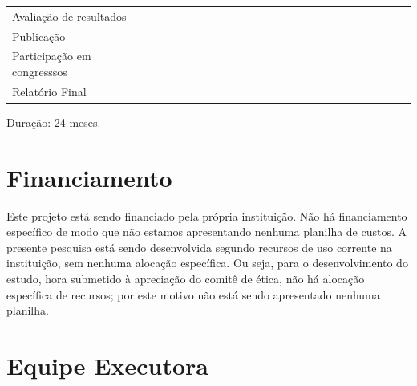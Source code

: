 \documentclass[rascunho,xindy]{Classe-Latex-FEI/fei}
\begin{document}
\begin{landscape}
\begin{table}[ht]
\begin{center}
\begin{tabular}{|l |l |l |l |l ||l |l |l |l ||l |l |l |l ||l |l |l |l ||l |l |l |l ||l |l |l |l ||}
      Avaliação de resultados           &   &   &   &   & \cellcolor{black!80} & \cellcolor{black!80} & \cellcolor{black!80} & \cellcolor{black!80} & \cellcolor{black!80} &   &   &   &   &   &   &   &   &   &   &   &   &   &   &   \\ 
      Publicação                        &   &   &   &   &   & \cellcolor{black!80} & \cellcolor{black!80} & \cellcolor{black!80} & \cellcolor{black!80} &   &   &   &   &   &   &   &   &   &   &   &   &   &   &   \\
      Participação em congresssos       &   &   &   &   &   &   &   &   & \cellcolor{black!80} & \cellcolor{black!80} &   &   &   &   &   &   &   &   &   &   &   &   &   &   \\
      \hline
      Relatório Final                   &   & \cellcolor{black!80} & \cellcolor{black!80} & \cellcolor{black!80} & \cellcolor{black!80} & \cellcolor{black!80} & \cellcolor{black!80} & \cellcolor{black!80} & \cellcolor{black!80} & \cellcolor{black!80} & \cellcolor{black!80} & \cellcolor{black!80} & \cellcolor{black!80} & \cellcolor{black!80} & \cellcolor{black!80} & \cellcolor{black!80} & \cellcolor{black!80} & \cellcolor{black!80} & \cellcolor{black!80} & \cellcolor{black!80} & \cellcolor{black!80} & \cellcolor{black!80} & \cellcolor{black!80} &  \cellcolor{black!80} \\
      \hline
      \end{tabular}
  \end{center}
  \label{table:cronograma}
\end{table} 

Duração: 24 meses.

\end{landscape}

\chapter{Financiamento}

Este projeto está sendo financiado pela própria instituição. Não há financiamento específico de modo que não estamos apresentando nenhuma planilha de custos. A presente pesquisa está sendo desenvolvida segundo recursos de uso corrente na instituição, sem nenhuma alocação específica. Ou seja, para o desenvolvimento do estudo, hora submetido à apreciação do comitê de ética, não há alocação específica de recursos; por este motivo não está sendo apresentado nenhuma planilha.

\chapter{Equipe Executora}
\end{document}

